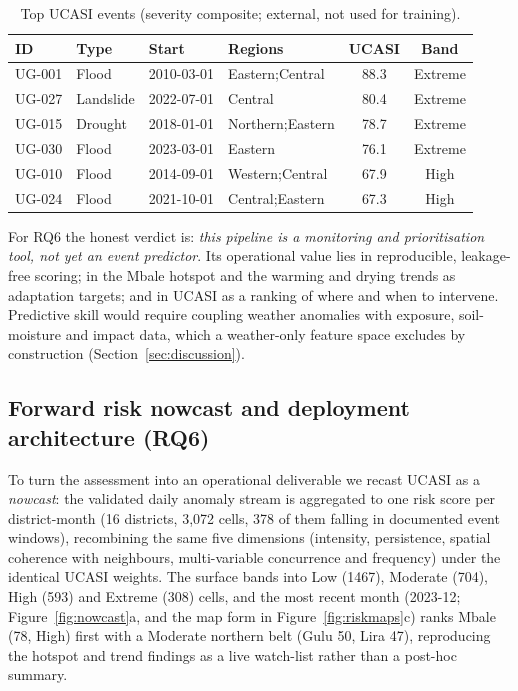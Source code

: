 \documentclass[preprint,12pt]{elsarticle}
\begin{document}
\begin{table}[h]
\centering\small
\caption{Top UCASI events (severity composite; external, not used for training).}
\label{tab:ucasi}
\begin{tabular}{llllcc}
\toprule
ID & Type & Start & Regions & UCASI & Band \\
\midrule
UG-001 & Flood     & 2010-03-01 & Eastern;Central   & 88.3 & Extreme \\
UG-027 & Landslide & 2022-07-01 & Central           & 80.4 & Extreme \\
UG-015 & Drought   & 2018-01-01 & Northern;Eastern  & 78.7 & Extreme \\
UG-030 & Flood     & 2023-03-01 & Eastern           & 76.1 & Extreme \\
UG-010 & Flood     & 2014-09-01 & Western;Central   & 67.9 & High \\
UG-024 & Flood     & 2021-10-01 & Central;Eastern   & 67.3 & High \\
\bottomrule
\end{tabular}
\end{table}

For RQ6 the honest verdict is: \emph{this pipeline is a monitoring and
prioritisation tool, not yet an event predictor}. Its operational value lies in
reproducible, leakage-free scoring; in the Mbale hotspot and the warming and drying
trends as adaptation targets; and in UCASI as a ranking of where and when to
intervene. Predictive skill would require coupling weather anomalies with
exposure, soil-moisture and impact data, which a weather-only feature space
excludes by construction (Section~\ref{sec:discussion}).

\subsection{Forward risk nowcast and deployment architecture (RQ6)}\label{sec:ews}
To turn the assessment into an operational deliverable we recast UCASI as a
\emph{nowcast}: the validated daily anomaly stream is aggregated to one
risk score per district-month (16 districts, 3{,}072 cells, 378 of them falling in
documented event windows), recombining the same five dimensions (intensity,
persistence, spatial coherence with neighbours, multi-variable concurrence and
frequency) under the identical UCASI weights. The surface bands into Low
(1{467}), Moderate (704), High (593) and Extreme (308) cells, and the most recent
month (2023-12; Figure~\ref{fig:nowcast}a, and the map form in
Figure~\ref{fig:riskmaps}c) ranks Mbale (78, High) first
with a Moderate northern belt (Gulu 50, Lira 47), reproducing the hotspot and
trend findings as a live watch-list rather than a post-hoc summary.
\end{document}

